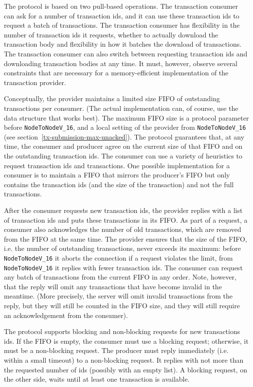 The protocol is based on two pull-based operations.
The transaction consumer can ask for a number of transaction ids, and it can use these
transaction ids to request a batch of transactions.
The transaction consumer has flexibility in the number of transaction ids it requests,
whether to actually download the transaction body
and flexibility in how it batches the download of transactions.
The transaction consumer can also switch between requesting transaction ids and downloading
transaction bodies at any time.
It must, however, observe several constraints that are necessary for a memory-efficient implementation
of the transaction provider.

Conceptually, the provider maintains a limited size FIFO of outstanding transactions per consumer.
(The actual implementation can, of course, use the data structure that works best).
The maximum FIFO size is a protocol parameter before \texttt{NodeToNodeV\_16},
and a local setting of the provider from \texttt{NodeToNodeV\_16} (see
section~\ref{tx-submission-max-unacked}).
The protocol guarantees that, at any time, the consumer and producer agree on the current size of
that FIFO and on the outstanding transaction ids.
The consumer can use a variety of heuristics to request transaction ids and transactions.
One possible implementation for a consumer is to maintain a FIFO that mirrors the producer's FIFO
but only contains the transaction ids (and the size of the transaction) and not the full transactions.

After the consumer requests new transaction ids, the provider replies with a list of transaction ids and
puts these transactions in its FIFO.
As part of a request, a consumer also acknowledges the number of old transactions,
which are removed from the FIFO at the same time.
The provider ensures that the size of the FIFO, i.e. the number of outstanding transactions,
never exceeds its maximum: before \texttt{NodeToNodeV\_16} it aborts the connection if a request
violates the limit, from \texttt{NodeToNodeV\_16} it replies with fewer transaction ids.
The consumer can request any batch of transactions from the current FIFO in any order.
Note, however, that the reply will omit any transactions that have become invalid in the meantime.
(More precisely, the server will omit invalid transactions from the reply, but they will still be counted in the FIFO
size, and they will still require an acknowledgement from the consumer).

The protocol supports blocking and non-blocking requests for new transactions ids.
If the FIFO is empty, the consumer must use a blocking request; otherwise, it must be a non-blocking request.
The producer must reply immediately (i.e. within a small timeout) to a non-blocking request.
It replies with not more than the requested number of ids (possibly with an empty list).
A blocking request, on the other side, waits until at least one transaction is available.

